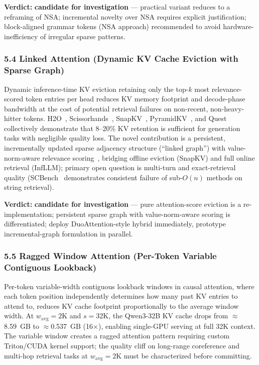 \documentclass[11pt]{article}
\begin{document}
\textbf{Verdict:} \textbf{candidate for investigation} --- practical variant reduces to a reframing of NSA; incremental novelty over NSA requires explicit justification; block-aligned grammar tokens (NSA approach) recommended to avoid hardware-inefficiency of irregular sparse patterns.

\subsubsection{5.4 Linked Attention (Dynamic KV Cache Eviction with Sparse Graph)}
\label{sec:idea_5_4}

Dynamic inference-time KV eviction retaining only the top-$k$ most relevance-scored token entries per head reduces KV memory footprint and decode-phase bandwidth at the cost of potential retrieval failures on non-recent, non-heavy-hitter tokens.
H2O~\cite{Zhang2023H2O}, Scissorhands~\cite{Liu2023Scissorhands}, SnapKV~\cite{Li2024SnapKV}, PyramidKV~\cite{Cai2024PyramidKV}, and Quest~\cite{Tang2024Quest} collectively demonstrate that 8--20\% KV retention is sufficient for generation tasks with negligible quality loss.
The novel contribution is a persistent, incrementally updated sparse adjacency structure (``linked graph'') with value-norm-aware relevance scoring~\cite{Yu2024VATP}, bridging offline eviction (SnapKV) and full online retrieval (InfLLM); primary open question is multi-turn and exact-retrieval quality (SCBench~\cite{Li2024SCBench} demonstrates consistent failure of sub-$O(n)$ methods on string retrieval).

\textbf{Verdict:} \textbf{candidate for investigation} --- pure attention-score eviction is a re-implementation; persistent sparse graph with value-norm-aware scoring is differentiated; deploy DuoAttention-style hybrid immediately, prototype incremental-graph formulation in parallel.

\subsubsection{5.5 Ragged Window Attention (Per-Token Variable Contiguous Lookback)}
\label{sec:idea_5_5}

Per-token variable-width contiguous lookback windows in causal attention, where each token position independently determines how many past KV entries to attend to, reduces KV cache footprint proportionally to the average window width.
At $w_{\text{avg}} = 2\text{K}$ and $s = 32\text{K}$, the Qwen3-32B KV cache drops from $\approx$8.59~GB to $\approx$0.537~GB (16$\times$), enabling single-GPU serving at full 32K context.
The variable window creates a ragged attention pattern requiring custom Triton/CUDA kernel support; the quality cliff on long-range coreference and multi-hop retrieval tasks at $w_{\text{avg}} = 2\text{K}$ must be characterized before committing.
\end{document}
